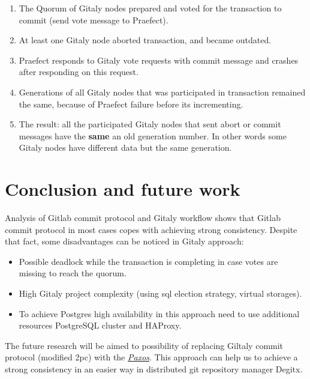 \documentclass[acmlarge, screen, nonacm]{acmart}
\begin{document}
\begin{enumerate}
\item The Quorum of Gitaly nodes prepared and voted for the transaction to commit (send vote message to Praefect).
\item At least one Gitaly node aborted transaction, and became outdated.
\item Praefect responds to Gitaly vote requests with commit message and crashes after responding on this request.
\item Generations of all Gitaly nodes that was participated in transaction remained the same, because of Praefect 
failure before its incrementing.
\item The result: all the participated Gitaly nodes that sent abort or commit messages have the \textbf{same} an 
old generation number. In other words some Gitaly nodes have different data but the same generation.
\end{enumerate}


\section{Conclusion and future work}

Analysis of Gitlab commit protocol and Gitaly workflow shows that Gitlab commit protocol in most cases
copes with achieving strong consistency. Despite that 
fact, some disadvantages can be noticed in Gitaly approach:
\begin{itemize}
\item Possible deadlock while the transaction is completing in case votes are missing to reach the quorum.
\item High Gitaly project complexity (using sql election strategy, virtual storages).
\item To achieve Postgres high availability in this approach need to use additional resources PostgreSQL cluster and HAProxy. 
\end{itemize}
The future research will be aimed to possibility of replacing Giltaly commit protocol (modified 2pc) 
with the \emph{\href{https://en.wikipedia.org/wiki/Paxos_(computer_science)}{Paxos}}. This approach can help us to achieve 
a strong consistency in an easier way in distributed git repository manager Degitx.
\end{document}
